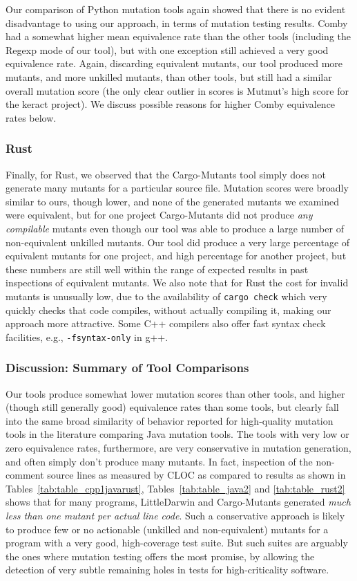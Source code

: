 \documentclass[sigconf,review, anonymous]{acmart}
\begin{document}
{Our comparison of Python mutation tools again showed that there is no
evident disadvantage to
using our approach, in terms of mutation testing results.  Comby had a somewhat higher mean equivalence rate than the
other tools (including the Regexp mode of our tool), but with one
exception still achieved a very good equivalence rate.  Again, discarding
equivalent mutants, our tool produced more mutants, and more unkilled
mutants, than other tools, but still had a similar overall mutation
score (the only clear outlier in scores is Mutmut's high score for the
keract project).  We discuss
possible reasons for higher Comby equivalence rates below.

\subsubsection{Rust}

Finally, for Rust, we observed that the Cargo-Mutants tool simply does
not generate many mutants for a particular source file.  Mutation scores were broadly similar to
ours, though lower, and none of the generated mutants we examined were
equivalent, but for one project Cargo-Mutants did not produce
\emph{any compilable} mutants even though our tool was able to produce a large
number of non-equivalent unkilled mutants.  Our tool did produce a
very large percentage of equivalent mutants for one project, and high
percentage for another project, but these numbers are still well
within the range of expected results in past inspections of
equivalent mutants.  We also note  that for Rust the cost for invalid
mutants is unusually low, due to the availability of {\tt cargo check}
which very quickly checks that code compiles, without actually
compiling it, making our approach more attractive.  Some C++ compilers
also offer fast syntax check facilities, e.g., {\tt -fsyntax-only} in g++.

\subsubsection{Discussion: Summary of Tool Comparisons}

Our tools produce somewhat lower mutation scores than other tools, and
higher (though still generally good) equivalence rates than some
tools, but clearly fall into the same broad similarity of behavior
reported for high-quality mutation tools in the literature comparing
Java mutation tools.   The tools with very low or zero equivalence rates, furthermore,
are very conservative in mutation generation, and often simply don't
produce many mutants.  In fact, inspection of the non-comment source
lines as measured by CLOC as compared to results as shown in Tables~\ref{tab:table_cpp1javarust},
Tables~\ref{tab:table_java2} and 
\ref{tab:table_rust2} shows that for many programs, LittleDarwin and
Cargo-Mutants generated \emph{much less than one mutant per actual
  line code}.  Such a conservative approach is likely to produce few
or no actionable (unkilled and non-equivalent) mutants for a program
with a very good, high-coverage test suite.  But such suites are
arguably the ones where mutation testing offers the most promise, by
allowing the detection of very subtle remaining holes in tests for
high-criticality software.

}
\end{document}
